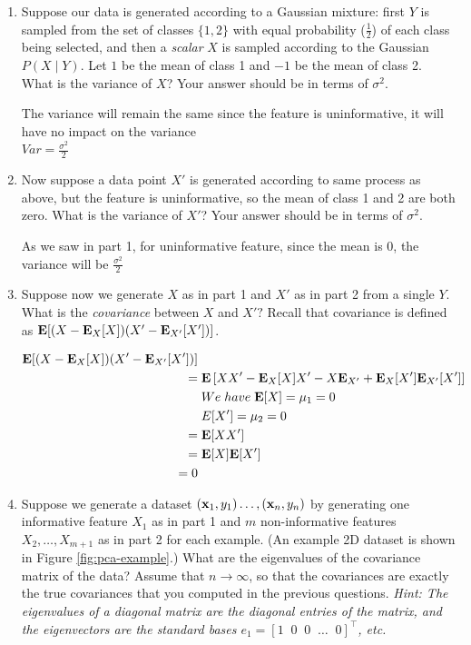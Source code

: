 \begin{enumerate}
\item {} Suppose our data is generated according to a Gaussian
  mixture: first $Y$ is sampled from the set of classes $\{1, 2\}$
  with equal probability ($\frac{1}{2}$) of each class being selected,
  and then a {\em scalar} $X$ is sampled according to the Gaussian
  $P(X \mid Y)$. Let $1$ be the mean of class 1 and $-1$ be the mean
  of class 2.  What is the variance of $X$? Your answer should be in
  terms of $\sigma^2$.

The variance will remain the same since the feature is uninformative, it will have no impact on the variance \\
$Var = \frac{\sigma^2}{2}$ \\

\item {} Now suppose a data point $X'$ is generated according
  to same process as above, but the feature is uninformative, so the
  mean of class 1 and 2 are both zero.  What is the variance of $X'$?
  Your answer should be in terms of $\sigma^2$.

As we saw in part 1, for uninformative feature, since the mean is 0, the variance will be $\frac{\sigma^2}{2}$ \\

\item {} Suppose now we generate $X$ as in part 1 and $X'$ as
  in part 2 from a single $Y$. What is the {\em covariance} between
  $X$ and $X'?$ Recall that covariance is defined as $\mathbf{E}[
    (X-\mathbf{E}_X[X])(X'-\mathbf{E}_{X'}[X']) ]$.

\begin{align*}
	\mathbf{E}[(X-\mathbf{E}_X[X])(X'-\mathbf{E}_{X'}[X']) ] \\
	=&\;  \mathbf{E} \left[ X X' - \mathbf{E}_X [X] X' - X \mathbf{E}_{X'} + \mathbf{E}_X[X'] \mathbf{E}_{X'}[X'] \right] \\
	&\; We \; have \; \mathbf{E}[X] = \mu_1 = 0 \\
	&\; E[X'] = \mu_2 = 0 \\
	=&\; \mathbf{E} [X X'] \\
	=&\; \mathbf{E} [X] \mathbf{E}[X'] \\
	= 0 \\
\end{align*}

\item {} Suppose we generate a dataset $(\mathbf{x}_1,y_1) \dots,
  (\mathbf{x}_n,y_n)$ by generating one informative feature $X_1$ as in part
  1 and $m$ non-informative features $X_2, \dots, X_{m+1}$ as in part
  2 for each example. (An example 2D dataset is shown in Figure
  \ref{fig:pca-example}.) What are the eigenvalues of the covariance
  matrix of the data? Assume that $n \rightarrow \infty$, so that the
  covariances are exactly the true covariances that you computed in
  the previous questions.  {\em Hint: The eigenvalues of a diagonal
    matrix are the diagonal entries of the matrix, and the
    eigenvectors are the standard bases $e_1 = [1 \;\; 0 \;\; 0 \;\;
      \dots \;\; 0]^\top$, etc.}


\end{enumerate}
